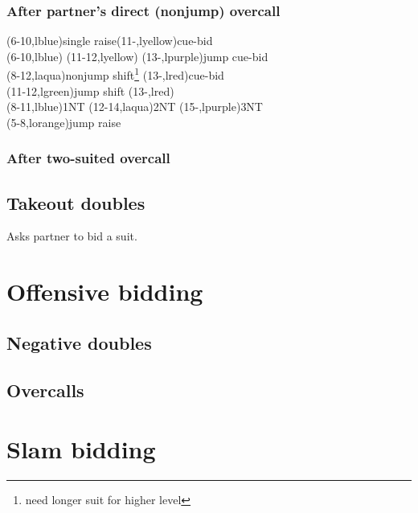 \documentclass[oneside]{memoir}
\begin{document}
\subsection{After partner's direct (nonjump) overcall}
\begin{ptable}
  \bid*(6-10,lblue){single raise}\bid*(11-,lyellow){cue-bid}\\
  \bid(6-10,lblue){}
  \bid(11-12,lyellow){}
  \bid(13-,lpurple){jump cue-bid}\\
  \bid(8-12,laqua){nonjump shift\footnote{need longer suit for higher level}}
  \bid*(13-,lred){cue-bid}\\
  \bid(11-12,lgreen){jump shift}
  \bid(13-,lred){}\\
  \bid(8-11,lblue){1NT}
  \bid(12-14,laqua){2NT}
  \bid(15-,lpurple){3NT}\\
\bid(5-8,lorange){jump raise}\\
\end{ptable}

\subsection{After two-suited overcall}

\section{Takeout doubles}
Asks partner to bid a suit.


\chapter{Offensive bidding}


\section{Negative doubles}

\section{Overcalls}


\chapter{Slam bidding}
\end{document}
